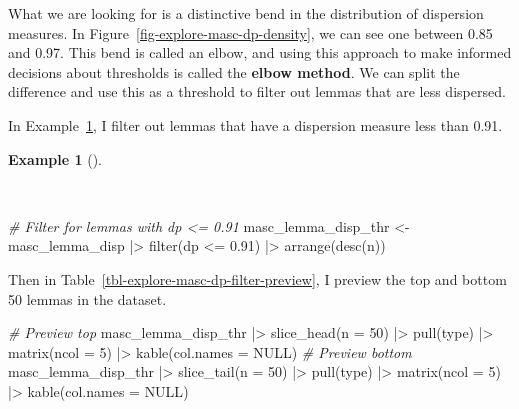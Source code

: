\documentclass[
  letterpaper,
]{latex/krantz}
\newenvironment{Shaded}{\begin{snugshade}}{\end{snugshade}}
\newcommand{\AttributeTok}[1]{\textcolor[rgb]{0.00,0.00,0.00}{#1}}
\newcommand{\CommentTok}[1]{\textcolor[rgb]{0.00,0.00,0.00}{\textit{#1}}}
\newcommand{\ConstantTok}[1]{\textcolor[rgb]{0.00,0.00,0.00}{#1}}
\newcommand{\DecValTok}[1]{\textcolor[rgb]{0.00,0.00,0.00}{#1}}
\newcommand{\FloatTok}[1]{\textcolor[rgb]{0.00,0.00,0.00}{#1}}
\newcommand{\FunctionTok}[1]{\textcolor[rgb]{0.00,0.00,0.00}{#1}}
\newcommand{\NormalTok}[1]{\textcolor[rgb]{0.00,0.00,0.00}{#1}}
\newcommand{\OtherTok}[1]{\textcolor[rgb]{0.00,0.00,0.00}{#1}}
\newcommand{\SpecialCharTok}[1]{\textcolor[rgb]{0.00,0.00,0.00}{#1}}
\theoremstyle{definition}
\newtheorem{example}{Example}[chapter]
\theoremstyle{remark}
\begin{document}
What we are looking for is a distinctive bend in the distribution of
dispersion measures. In Figure~\ref{fig-explore-masc-dp-density}, we can
see one between 0.85 and 0.97. This bend is called an elbow, and using
this approach to make informed decisions about thresholds is called the
\textbf{elbow method}. We can split the difference and use this as a
threshold to filter out lemmas that are less dispersed.

In Example~\ref{exm-explore-masc-dp-filter}, I filter out lemmas that
have a dispersion measure less than 0.91.

\begin{example}[]\protect\hypertarget{exm-explore-masc-dp-filter}{}\label{exm-explore-masc-dp-filter}

~

\begin{Shaded}
\begin{Highlighting}[]
\CommentTok{\# Filter for lemmas with dp \textless{}= 0.91}
\NormalTok{masc\_lemma\_disp\_thr }\OtherTok{\textless{}{-}}
\NormalTok{  masc\_lemma\_disp }\SpecialCharTok{|\textgreater{}}
  \FunctionTok{filter}\NormalTok{(dp }\SpecialCharTok{\textless{}=} \FloatTok{0.91}\NormalTok{) }\SpecialCharTok{|\textgreater{}}
  \FunctionTok{arrange}\NormalTok{(}\FunctionTok{desc}\NormalTok{(n))}
\end{Highlighting}
\end{Shaded}

\end{example}

Then in Table~\ref{tbl-explore-masc-dp-filter-preview}, I preview the
top and bottom 50 lemmas in the dataset.

\begin{Shaded}
\begin{Highlighting}[]
\CommentTok{\# Preview top}
\NormalTok{masc\_lemma\_disp\_thr }\SpecialCharTok{|\textgreater{}}
  \FunctionTok{slice\_head}\NormalTok{(}\AttributeTok{n =} \DecValTok{50}\NormalTok{) }\SpecialCharTok{|\textgreater{}}
  \FunctionTok{pull}\NormalTok{(type) }\SpecialCharTok{|\textgreater{}}
  \FunctionTok{matrix}\NormalTok{(}\AttributeTok{ncol =} \DecValTok{5}\NormalTok{) }\SpecialCharTok{|\textgreater{}}
  \FunctionTok{kable}\NormalTok{(}\AttributeTok{col.names =} \ConstantTok{NULL}\NormalTok{)}
\CommentTok{\# Preview bottom}
\NormalTok{masc\_lemma\_disp\_thr }\SpecialCharTok{|\textgreater{}}
  \FunctionTok{slice\_tail}\NormalTok{(}\AttributeTok{n =} \DecValTok{50}\NormalTok{) }\SpecialCharTok{|\textgreater{}}
  \FunctionTok{pull}\NormalTok{(type) }\SpecialCharTok{|\textgreater{}}
  \FunctionTok{matrix}\NormalTok{(}\AttributeTok{ncol =} \DecValTok{5}\NormalTok{) }\SpecialCharTok{|\textgreater{}}
  \FunctionTok{kable}\NormalTok{(}\AttributeTok{col.names =} \ConstantTok{NULL}\NormalTok{)}
\end{Highlighting}
\end{Shaded}
\end{document}
